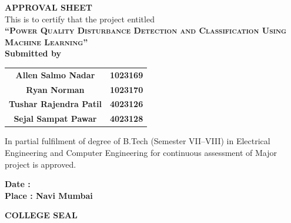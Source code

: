\documentclass[12pt,a4paper]{report}
\begin{document}
\setcounter{page}{1}

\begin{center}
\vspace*{0.2cm}
{\LARGE\bf APPROVAL SHEET} \\[0.5cm]

{\large This is to certify that the project entitled}\\[0.25cm]

{\Large\bf \textsc{``Power Quality Disturbance Detection and Classification Using Machine Learning''}}\\[0.35cm]

{\large\bf Submitted by}\\[0.3cm]

\begin{tabular}{cc}
\large\textbf{Allen Salmo Nadar} & \large\textbf{1023169} \\
\large\textbf{Ryan Norman} & \large\textbf{1023170} \\
\large\textbf{Tushar Rajendra Patil} & \large\textbf{4023126} \\
\large\textbf{Sejal Sampat Pawar} & \large\textbf{4023128}
\end{tabular}

\vspace{0.5cm}

{\large
In partial fulfilment of degree of B.Tech (Semester VII--VIII) in Electrical Engineering and Computer Engineering for continuous assessment of Major project is approved.
\par
}

\vspace{0.8cm}



\begin{flushleft}
\textbf{Date : }\\[0.15cm]
\textbf{Place : Navi Mumbai} 
\end{flushleft}

\vspace{-0.2cm}
\textbf{COLLEGE SEAL}

\end{center}
\clearpage
\end{document}
